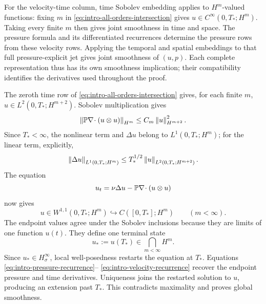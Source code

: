 For the velocity-time column, time Sobolev embedding applies to
\(H^m\)-valued functions: fixing \(m\) in
\eqref{eq:intro-all-orders-intersection} gives
\(u\in C^\infty(0,T_*;H^m)\).  Taking every finite \(m\) then gives
joint smoothness in time and space.  The pressure formula and its
differentiated recurrences determine the pressure rows from these velocity
rows.  Applying the temporal and spatial embeddings to that full
pressure-explicit jet gives joint smoothness of \((u,p)\).
Each complete representation thus has its own smoothness implication;
their compatibility identifies the derivatives used throughout the proof.

The zeroth time row of \eqref{eq:intro-all-orders-intersection} gives, for
each finite \(m\), \(u\in L^2(0,T_*;H^{m+2})\).  Sobolev multiplication gives
\[
 \left\lVert \mathbb P\nabla\!\cdot(u\otimes u)\right\rVert_{H^m}
 \le C_m\left\lVert u\right\rVert_{H^{m+2}}^2.
\]
Since \(T_*<\infty\), the nonlinear term and \(\Delta u\) belong to
\(L^1(0,T_*;H^m)\); for the linear term, explicitly,
\[
 \left\lVert \Delta u\right\rVert_{L^1(0,T_*;H^m)}
 \le T_*^{1/2}\left\lVert u\right\rVert_{L^2(0,T_*;H^{m+2})}.
\]
The equation
\[
 u_t=\nu\Delta u-\mathbb P\nabla\!\cdot(u\otimes u)
\]
now gives
\[
 u\in W^{1,1}(0,T_*;H^m)
 \hookrightarrow C([0,T_*];H^m)
 \qquad(m<\infty).
\]
The endpoint values agree under the Sobolev inclusions because they are limits
of one function \(u(t)\).  They define one terminal state
\[
 u_*:=u(T_*)\in\bigcap_{m<\infty}H^m.
\]
Since \(u_*\in H^\infty_\sigma\), local well-posedness restarts the equation
at \(T_*\).  Equations \eqref{eq:intro-pressure-recurrence}--%
\eqref{eq:intro-velocity-recurrence} recover the endpoint pressure and time
derivatives.  Uniqueness joins the restarted solution to \(u\), producing an
extension past \(T_*\).  This contradicts maximality and proves global
smoothness.

\clearpage
